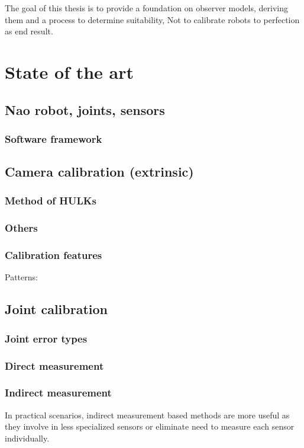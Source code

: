 \documentclass[english, printversion, nomenclature]{tuvisionthesis} %
\begin{document}
The goal of this thesis is to provide a foundation on observer models, deriving them and a process to determine suitability, Not to calibrate robots to perfection as end result.

\chapter{State of the art}

\section{Nao robot, joints, sensors}
\subsection{Software framework}

\section{Camera calibration (extrinsic)}
\subsection{Method of HULKs}

\subsection{Others}
\subsection{Calibration features}
Patterns: 

\section{Joint calibration}
\subsection{Joint error types}
\subsection{Direct measurement}
\subsection{Indirect measurement}
In practical scenarios, indirect measurement based methods are more useful as they involve in less specialized sensors or eliminate need to measure each sensor individually.
\end{document}
